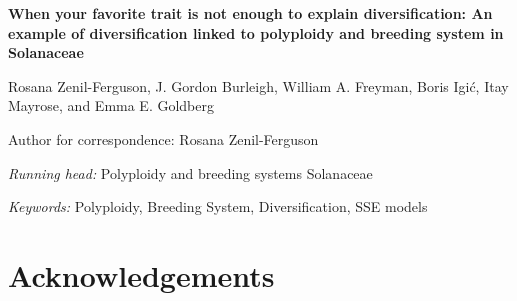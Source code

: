 \documentclass[11pt]{article}
\begin{document}

\begin{center}
    \textbf{When your favorite trait is not enough to explain diversification: An example of diversification linked to polyploidy and breeding system in Solanaceae}
\end{center}

\vfill

\noindent
Rosana Zenil-Ferguson,%
%
\noindent
J. Gordon Burleigh,%
%
\noindent
William A. Freyman,%
%
\noindent
Boris Igi\'c,%
%
\noindent
Itay Mayrose,%
%
and
Emma E. Goldberg%

\vfill

\theendnotes

\noindent
Author for correspondence: Rosana Zenil-Ferguson

\vfill

\noindent
\textit{Running head:} Polyploidy and breeding systems Solanaceae

\vfill

\noindent
\textit{Keywords:} 
Polyploidy,
Breeding System,
Diversification, SSE models

\vfill

\linenumbers


\clearpage



\clearpage





\section{Acknowledgements}


\clearpage


\setstretch{\stretchby}
\end{document}
